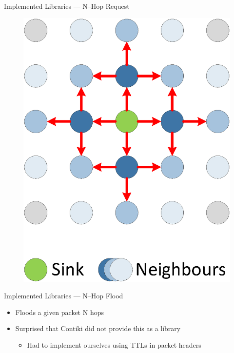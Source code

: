 \documentclass[usenames,dvipsnames]{beamer}
\begin{document}
\begin{frame}{Implemented Libraries --- N--Hop Request}
\begin{figure}[H]
\includegraphics[scale=0.3]{../Report/Diagrams/2-hop-flooding.eps}
\end{figure}
\end{frame}

\begin{frame}{Implemented Libraries --- N--Hop Flood}
	\begin{itemize}
		\item Floods a given packet N hops
		\item Surprised that Contiki did not provide this as a library
			\begin{itemize}
				\item Had to implement ourselves using TTLs in packet headers
			\end{itemize}
	\end{itemize}
\end{frame}
\end{document}
